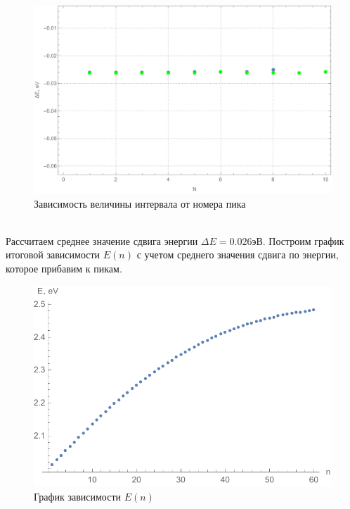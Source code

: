 \documentclass[a4paper, 12pt]{article}
\begin{document}
\begin{figure}[!htb]
\centering
\includegraphics[scale=0.6]{plot7.pdf}
\caption{Зависимость величины интервала от номера пика}
\label{plot7}
\end{figure}\\
Рассчитаем среднее значение сдвига энергии $\Delta E=0.026 эВ$. Построим график итоговой зависимости $E(n)$ с учетом среднего значения сдвига по энергии, которое прибавим к пикам.
\newpage
\begin{figure}[!htb]
\centering
\includegraphics[scale=0.8]{plotNew0.pdf}
\caption{График зависимости $E(n)$}
\end{figure}
\end{document}
